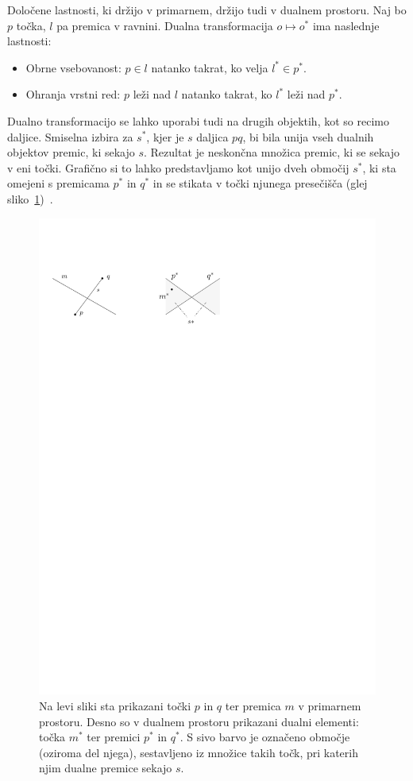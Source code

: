 \documentclass[a4paper, 12pt]{book}
\begin{document}
Določene lastnosti, ki držijo v primarnem, držijo tudi v  dualnem prostoru. Naj bo $p$ točka, $l$ pa premica v ravnini. Dualna transformacija $o \mapsto o^*$ ima naslednje lastnosti:
\begin{itemize}
\item Obrne vsebovanost: $p\in l$ natanko takrat, ko velja $l^*\in p^*$.
\item Ohranja vrstni red: $p$ leži nad $l$ natanko takrat, ko $l^*$ leži nad $p^*$.  
\end{itemize}

Dualno transformacijo se lahko uporabi tudi na drugih objektih, kot so recimo daljice. Smiselna izbira za $s^*$, kjer je $s$ daljica $pq$, bi bila unija vseh dualnih objektov premic, ki sekajo $s$. Rezultat je neskončna množica premic, ki se sekajo v eni točki. Grafično si to lahko predstavljamo kot unijo dveh območij $s^*$, ki sta omejeni s premicama $p^*$ in $q^*$ in se stikata v točki njunega presečišča (glej sliko~\ref{dual-ex})~\cite[poglavje 8.2]{bkos-08-all}.

\begin{figure}[htp]
\centerline{\includegraphics[scale=1]{pics/dual-lines-example.pdf}}
\caption{Na levi sliki sta prikazani točki $p$ in $q$ ter premica $m$ v primarnem prostoru. Desno so v dualnem prostoru prikazani dualni elementi: točka $m^*$ ter premici $p^*$ in $q^*$. S sivo barvo je označeno območje (oziroma del njega), sestavljeno iz množice takih točk, pri katerih njim dualne premice sekajo $s$.} 
\label{dual-ex}
\end{figure}
\end{document}
